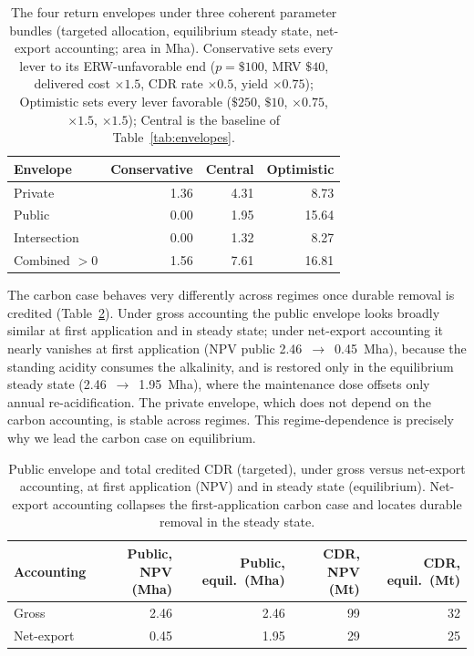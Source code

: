 \documentclass[12pt]{article}
\begin{document}
\begin{table}[t]
\centering
\caption{The four return envelopes under three coherent parameter bundles
(targeted allocation, equilibrium steady state, net-export accounting; area in Mha).
Conservative sets every lever to its ERW-unfavorable end
($p=\$100$, MRV $\$40$, delivered cost $\times1.5$, CDR rate $\times0.5$, yield
$\times0.75$); Optimistic sets every lever favorable ($\$250$, $\$10$, $\times0.75$,
$\times1.5$, $\times1.5$); Central is the baseline of Table~\ref{tab:envelopes}.}
\label{tab:scenarios}
\small
\begin{tabular}{lrrr}
\toprule
Envelope & Conservative & Central & Optimistic \\
\midrule
Private          & 1.36 & 4.31 & 8.73 \\
Public           & 0.00 & 1.95 & 15.64 \\
Intersection     & 0.00 & 1.32 & 8.27 \\
Combined $>0$    & 1.56 & 7.61 & 16.81 \\
\bottomrule
\end{tabular}
\end{table}

The carbon case behaves very differently across regimes once durable removal is
credited (Table~\ref{tab:regimes}). Under gross accounting the public envelope
looks broadly similar at first application and in steady state; under net-export
accounting it nearly vanishes at first application (NPV public
2.46~$\to$~0.45~Mha), because the standing acidity consumes the alkalinity, and
is restored only in the equilibrium steady state (2.46~$\to$~1.95~Mha), where the
maintenance dose offsets only annual re-acidification. The private envelope,
which does not depend on the carbon accounting, is stable across regimes. This
regime-dependence is precisely why we lead the carbon case on equilibrium.

\begin{table}[t]
\centering
\caption{Public envelope and total credited CDR (targeted), under gross versus
net-export accounting, at first application (NPV) and in steady state
(equilibrium). Net-export accounting collapses the first-application carbon case
and locates durable removal in the steady state.}
\label{tab:regimes}
\small
\begin{tabular}{lrrrr}
\toprule
Accounting & Public, NPV (Mha) & Public, equil.\ (Mha) & CDR, NPV (Mt) & CDR, equil.\ (Mt) \\
\midrule
Gross        & 2.46 & 2.46 & 99 & 32 \\
Net-export   & 0.45 & 1.95 & 29 & 25 \\
\bottomrule
\end{tabular}
\end{table}
\end{document}
